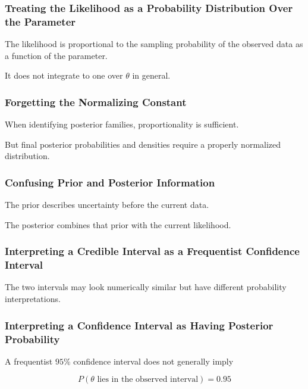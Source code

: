 \subsubsection{Treating the Likelihood as a Probability Distribution Over the Parameter}

The likelihood is proportional to the sampling probability of the
observed data as a function of the parameter.

It does not integrate to one over \(\theta\) in general.

\subsubsection{Forgetting the Normalizing Constant}

When identifying posterior families, proportionality is sufficient.

But final posterior probabilities and densities require a properly
normalized distribution.

\subsubsection{Confusing Prior and Posterior Information}

The prior describes uncertainty before the current data.

The posterior combines that prior with the current likelihood.

\subsubsection{Interpreting a Credible Interval as a Frequentist Confidence Interval}

The two intervals may look numerically similar but have different
probability interpretations.

\subsubsection{Interpreting a Confidence Interval as Having Posterior Probability}

A frequentist \(95\%\) confidence interval does not generally imply

\[
P(\theta\text{ lies in the observed interval})=0.95
\]

